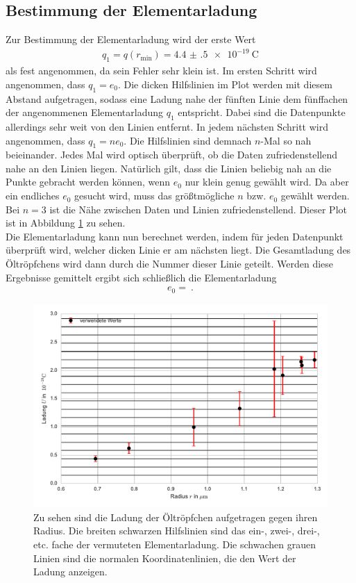\subsection{Bestimmung der Elementarladung}
Zur Bestimmung der Elementarladung wird der erste Wert
\begin{align}
	q_1 = q(r_\text{min}) = \SI{4.4(5)e-19}{\coulomb}
\end{align}
als fest angenommen, da sein Fehler sehr klein ist. Im ersten Schritt wird angenommen, dass $q_1=e_0$. Die dicken Hilfslinien im Plot werden mit diesem Abstand aufgetragen, sodass eine Ladung nahe der fünften Linie dem fünffachen der angenommenen Elementarladung $q_1$ entspricht. Dabei sind die Datenpunkte allerdings sehr weit von den Linien entfernt. In jedem nächsten Schritt wird angenommen, dass $q_1=ne_0$. Die Hilfslinien sind demnach $n$-Mal so nah beieinander. Jedes Mal wird optisch überprüft, ob die Daten zufriedenstellend nahe an den Linien liegen. Natürlich gilt, dass die Linien beliebig nah an die Punkte gebracht werden können, wenn $e_0$ nur klein genug gewählt wird. Da aber ein endliches $e_0$ gesucht wird, muss das größtmögliche $n$ bzw. $e_0$ gewählt werden. Bei $n=3$ ist die Nähe zwischen Daten und Linien zufriedenstellend. Dieser Plot ist in Abbildung \ref{fig:Elementarladung} zu sehen. \\
Die Elementarladung kann nun berechnet werden, indem für jeden Datenpunkt überprüft wird, welcher dicken Linie er am nächsten liegt. Die Gesamtladung des Öltröpfchens wird dann durch die Nummer dieser Linie geteilt. Werden diese Ergebnisse gemittelt ergibt sich schließlich die Elementarladung
\begin{align}\label{eq:Elementarladung}
	e_0 =  \ .
\end{align}
\begin{figure}[h!]
	\centering
	\includegraphics[width = \textwidth]{Plot.pdf}
	\caption{Zu sehen sind die Ladung der Öltröpfchen aufgetragen gegen ihren Radius. Die breiten schwarzen Hilfslinien sind das ein-, zwei-, drei-, etc. fache der vermuteten Elementarladung. Die schwachen grauen Linien sind die normalen Koordinatenlinien, die den Wert der Ladung anzeigen.}
	\label{fig:Elementarladung}
\end{figure}